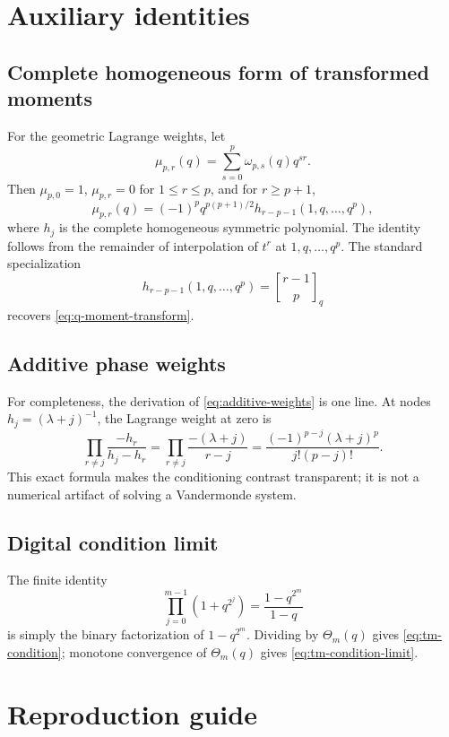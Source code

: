 \documentclass[11pt,oneside]{article}
\numberwithin{equation}{section}
\theoremstyle{definition}
\theoremstyle{remark}
\newcommand{\qbinom}[3]{\genfrac{[}{]}{0pt}{}{#1}{#2}_{#3}}
\begin{document}
\appendix

\section{Auxiliary identities}
\label{app:identities}

\subsection{Complete homogeneous form of transformed moments}

For the geometric Lagrange weights, let
\[
 \mu_{p,r}(q)=\sum_{s=0}^{p}\omega_{p,s}(q)q^{sr}.
\]
Then $\mu_{p,0}=1$, $\mu_{p,r}=0$ for $1\le r\le p$, and for $r\ge p+1$,
\begin{equation}
 \mu_{p,r}(q)
 =(-1)^pq^{p(p+1)/2}
 h_{r-p-1}(1,q,\ldots,q^p),
 \label{eq:complete-homogeneous-moment}
\end{equation}
where $h_j$ is the complete homogeneous symmetric polynomial.  The identity follows from
the remainder of interpolation of $t^r$ at $1,q,\ldots,q^p$.  The standard specialization
\[
 h_{r-p-1}(1,q,\ldots,q^p)=\qbinom{r-1}{p}{q}
\]
recovers \eqref{eq:q-moment-transform}.

\subsection{Additive phase weights}

For completeness, the derivation of \eqref{eq:additive-weights} is one line.  At nodes
$h_j=(\lambda+j)^{-1}$, the Lagrange weight at zero is
\[
 \prod_{r\ne j}\frac{-h_r}{h_j-h_r}
 =\prod_{r\ne j}\frac{-(\lambda+j)}{r-j}
 =\frac{(-1)^{p-j}(\lambda+j)^p}{j!(p-j)!}.
\]
This exact formula makes the conditioning contrast transparent; it is not a numerical
artifact of solving a Vandermonde system.

\subsection{Digital condition limit}

The finite identity
\[
 \prod_{j=0}^{m-1}(1+q^{2^j})=\frac{1-q^{2^m}}{1-q}
\]
is simply the binary factorization of $1-q^{2^m}$.  Dividing by
$\Theta_m(q)$ gives \eqref{eq:tm-condition}; monotone convergence of
$\Theta_m(q)$ gives \eqref{eq:tm-condition-limit}.

\section{Reproduction guide}
\label{app:reproduction}
\end{document}

